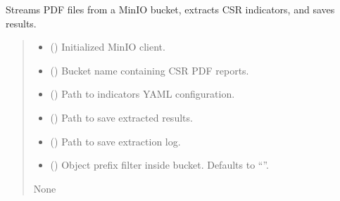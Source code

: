 \documentclass[letterpaper,10pt,english]{sphinxmanual}
\begin{document}
\begin{fulllineitems}
\label{\detokenize{autoapi/modules/input/minio_streaming_extractor/index:modules.input.minio_streaming_extractor.stream_pdf_and_extract}}
\pysigstartsignatures
\pysiglinewithargsret
{}
{\sphinxparamcomma {}\sphinxparamcomma {}\sphinxparamcomma {}\sphinxparamcomma {}\sphinxparamcomma {}}
{}
\pysigstopsignatures
\sphinxAtStartPar
Streams PDF files from a MinIO bucket, extracts CSR indicators, and saves results.
\begin{quote}\begin{description}
\begin{itemize}
\item {} 
\sphinxAtStartPar
{} () \textendash{} Initialized MinIO client.

\item {} 
\sphinxAtStartPar
{} () \textendash{} Bucket name containing CSR PDF reports.

\item {} 
\sphinxAtStartPar
{} () \textendash{} Path to indicators YAML configuration.

\item {} 
\sphinxAtStartPar
{} () \textendash{} Path to save extracted results.

\item {} 
\sphinxAtStartPar
{} () \textendash{} Path to save extraction log.

\item {} 
\sphinxAtStartPar
{} (\sphinxstyleliteralemphasis{\sphinxupquote{, }}) \textendash{} Object prefix filter inside bucket. Defaults to “”.

\end{itemize}

\sphinxAtStartPar
None

\end{description}\end{quote}

\end{fulllineitems}
\end{document}
